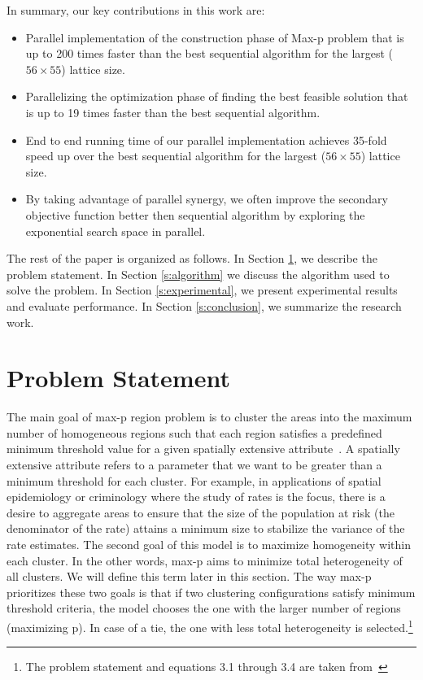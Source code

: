 \documentclass[conference]{IEEEtran}
\begin{document}
In summary, our key contributions in this work are:
\begin{itemize}

\item Parallel implementation of the construction phase of Max-p problem that is up to 200 times faster than the best sequential algorithm for the largest ($56\times 55$) lattice size.

\item Parallelizing the optimization phase of finding the best feasible solution that is up to 19 times faster than the best sequential algorithm.

\item End to end running time of our parallel implementation achieves 35-fold speed up over the best sequential algorithm for the largest ($56\times 55$) lattice size.

\item By taking advantage of parallel synergy, we often improve the secondary objective function better then sequential algorithm by exploring the exponential search space in parallel.

\end{itemize}

The rest of the paper is organized as follows. In Section \ref{s:problem}, we
 describe the problem statement. In
Section \ref{s:algorithm} we discuss the algorithm used to solve the problem. In Section \ref{s:experimental}, we
present experimental results and evaluate performance. In Section \ref{s:conclusion}, we
summarize the research work.


\section{Problem Statement}\label{s:problem}
The main goal of max-p region problem is to cluster the areas into the maximum number of
homogeneous regions such that each region satisfies a predefined minimum
threshold value for a given spatially extensive attribute~\cite{r1}. A spatially extensive
attribute refers to a parameter that we want to be greater than a minimum
threshold for each cluster. For example, in applications of spatial epidemiology
or criminology where the study of rates is the focus, there is a desire to
aggregate areas to ensure that the size of the population at risk (the
denominator of the rate) attains a minimum size to stabilize the variance of the
rate estimates. The second goal of this model is to maximize 
homogeneity within each cluster. In the other words, max-p aims to minimize total
heterogeneity of all clusters. We will define this term later in this section.
The way max-p prioritizes these two goals is that if two clustering
configurations satisfy minimum threshold criteria, the model chooses the one
with the larger number of regions (maximizing p). In case of a tie, the one with less
total heterogeneity is selected.\footnote{The problem statement and equations 3.1 through 3.4 are taken from~\cite{r1}}
\end{document}
